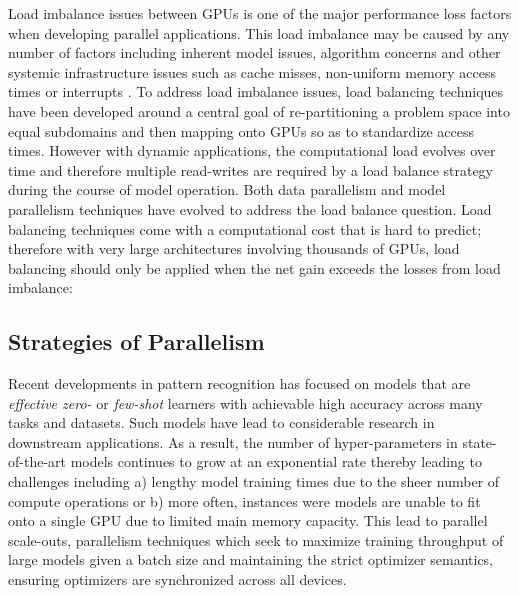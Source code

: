 \documentclass[10pt]{article}[draft]
\begin{document}
Load imbalance issues between GPUs is one of the major performance loss factors when developing parallel applications.  This load imbalance may be caused by any number of factors including inherent model issues, algorithm concerns and other systemic infrastructure issues such as cache misses, non-uniform memory access times or interrupts \cite{https://edoc.unibas.ch/59514/1/20180128130357_5a6dbc2d9750f.pdf, https://arxiv.org/pdf/1909.07168.pdf}. To address load imbalance issues, load balancing techniques have been developed around a central goal of re-partitioning a problem space into equal subdomains and then mapping onto GPUs so as to standardize access times. However with dynamic applications, the computational load evolves over time and therefore multiple read-writes are required by a load balance strategy during the course of model operation. Both data parallelism and model parallelism techniques have evolved to address the load balance question. Load balancing techniques come with a computational cost that is hard to predict; therefore with very large architectures involving thousands of GPUs, load balancing should only be applied when the net gain exceeds the losses from load imbalance:


\subsection{Strategies of Parallelism}
 
 Recent developments in pattern recognition has focused on models that are  \emph{effective zero-} or \emph{few-shot} learners with achievable high
 accuracy across many tasks and datasets. Such models  have lead to considerable research in downstream applications. As a result, the number of hyper-parameters in state-of-the-art models continues to grow at an exponential rate thereby leading to  challenges including a)  lengthy model training times due to the sheer number of compute operations or b) more often, instances were models are unable to fit onto a single GPU due to limited main memory capacity. This  lead to parallel scale-outs, parallelism techniques which seek to maximize training throughput of large models given a  batch size and maintaining the strict optimizer semantics, ensuring optimizers are synchronized across all devices.
 
\end{document}
